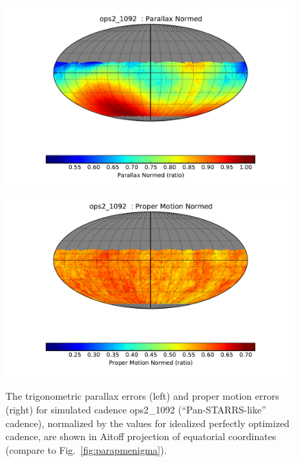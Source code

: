 \documentclass[manuscript]{article}
\begin{document}
\begin{figure}[t!]
\vskip -0.03in
\includegraphics[angle=0,width=0.49\hsize,clip]{ops2_1092_Parallax_Normed__HEAL_SkyMap.pdf}
\includegraphics[angle=0,width=0.49\hsize,clip]{ops2_1092_Proper_Motion_Normed__HEAL_SkyMap.pdf}
\vskip -0.2in
\caption{The trigonometric parallax errors (left) and proper motion errors (right)  for simulated cadence 
ops2\_1092 (``Pan-STARRS-like'' cadence), normalized by the values for idealized perfectly optimized 
cadence, are shown in Aitoff projection of equatorial coordinates (compare to Fig.~\ref{fig:parapmenigma}).} 
\label{fig:parapmenigma2}
\end{figure}
\end{document}
